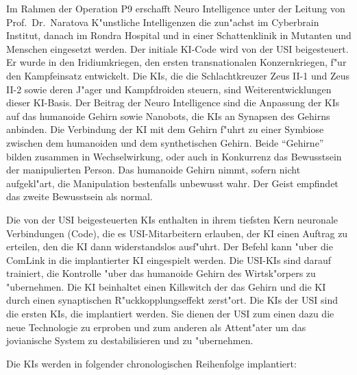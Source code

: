 
Im Rahmen der Operation P9 erschafft Neuro Intelligence unter der Leitung von Prof.~Dr.~Naratova K"unstliche Intelligenzen die zun"achst im Cyberbrain Institut, danach im Rondra Hospital und in einer Schattenklinik in Mutanten und Menschen eingesetzt werden. Der initiale KI-Code wird von der USI beigesteuert. Er wurde in den Iridiumkriegen, den ersten transnationalen Konzernkriegen, f"ur den Kampfeinsatz entwickelt. Die KIs, die die Schlachtkreuzer Zeus II-1 und Zeus II-2 sowie deren J"ager und Kampfdroiden steuern, sind Weiterentwicklungen dieser KI-Basis. Der Beitrag der Neuro Intelligence sind die Anpassung der KIs auf das humanoide Gehirn sowie Nanobots, die KIs an Synapsen des Gehirns anbinden. Die Verbindung der KI mit dem Gehirn f"uhrt zu einer Symbiose zwischen dem humanoiden und dem synthetischen Gehirn. Beide "`Gehirne"' bilden zusammen in Wechselwirkung, oder auch in Konkurrenz das Bewusstsein der manipulierten Person. Das humanoide Gehirn nimmt, sofern nicht aufgekl"art, die Manipulation bestenfalls unbewusst wahr. Der Geist empfindet das zweite Bewusstsein als normal.

Die von der USI beigesteuerten KIs enthalten in ihrem tiefsten Kern neuronale Verbindungen (Code), die es USI-Mitarbeitern erlauben, der KI einen Auftrag zu erteilen, den die KI dann widerstandslos ausf"uhrt. Der Befehl kann "uber die ComLink in die implantierter KI eingespielt werden. Die USI-KIs sind darauf trainiert, die Kontrolle "uber das humanoide Gehirn des Wirtsk"orpers zu "ubernehmen. Die KI beinhaltet einen Killswitch der das Gehirn und die KI durch einen synaptischen R"uckkopplungseffekt zerst"ort. Die KIs der USI sind die ersten KIs, die implantiert werden. Sie dienen der USI zum einen dazu die neue Technologie zu erproben und zum anderen als Attent"ater um das jovianische System zu destabilisieren und zu "ubernehmen. 

Die KIs werden in folgender chronologischen Reihenfolge implantiert:

